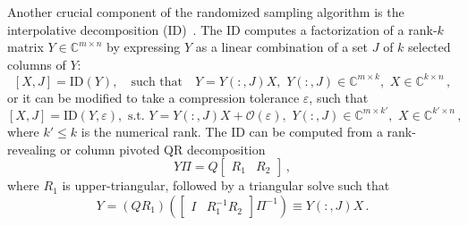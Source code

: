 \documentclass{article}
\begin{document}
Another crucial component of the randomized sampling algorithm is the
interpolative decomposition (ID)~\cite{cheng2005compression}. The ID
computes a factorization of a rank-$k$ matrix $Y \in \mathbb{C}^{m
  \times n}$ by expressing $Y$ as a linear combination of a set $J$ of
$k$ selected columns of $Y$:
\begin{equation}
  \left[ X, J \right] = \mathrm{ID}(Y), \quad \textrm{such that} \quad 
  Y = Y(:,J) X, \,\, Y(:,J) \in \mathbb{C}^{m \times k}, \,\, X \in \mathbb{C}^{k \times n} \, ,
\end{equation}
or it can be modified to take a compression tolerance $\varepsilon$,
such that
\begin{equation}
  \left[ X, J \right] = \mathrm{ID}(Y, \varepsilon), \,\, \textrm{s.t.} \,\, 
  Y = Y(:,J) X + \mathcal{O}(\varepsilon), \,\, Y(:,J) \in \mathbb{C}^{m \times k'}, \,\,
  X \in \mathbb{C}^{k' \times n} \, ,
\end{equation}
where $k' \leq k$ is the numerical rank. The ID can be computed from a
rank-revealing or column pivoted QR
decomposition~\cite{chan1987rank,quintana1998blas}
\begin{equation}
  Y \Pi = Q \begin{bmatrix} R_1 & R_2 \end{bmatrix} \, ,
\end{equation}
where $R_1$ is upper-triangular, followed by a triangular solve such
that
\begin{equation}
  Y = \left (QR_1 \right) \left( \begin{bmatrix} I & R^{-1}_1 R_2 \end{bmatrix} \Pi^{-1} \right) \equiv Y(:,J) X \, .
\end{equation}
\end{document}

